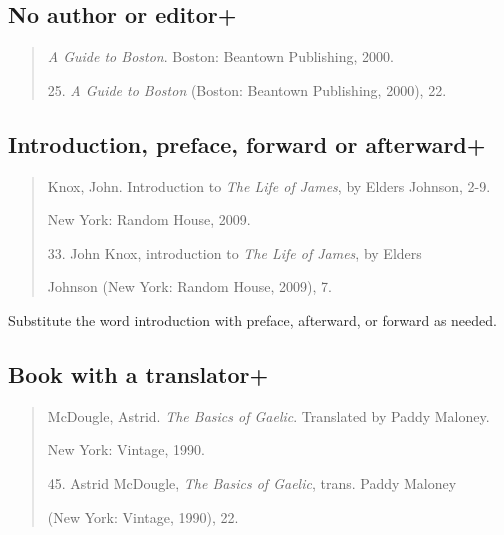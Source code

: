 \subsection{No author or editor+}

\begin{quote}

\emph{A Guide to Boston}. Boston: Beantown Publishing, 2000.

\medskip

\hspace{.4in}25. \emph{A Guide to Boston} (Boston: Beantown Publishing, 2000), 22.
\end{quote}

\subsection{Introduction, preface, forward or afterward+}
\begin{quote}

Knox, John. Introduction to \emph{The Life of James}, by Elders Johnson, 2-9.

\hspace{.4in}New York: Random House, 2009.

\medskip

\hspace{.4in}33. John Knox, introduction to \emph{The Life of James}, by Elders 

Johnson (New York: Random House, 2009), 7.
\end{quote}

 Substitute the word introduction with preface, afterward, or forward as needed.



\subsection{Book with a translator+} 
\begin{quote}
McDougle, Astrid. \emph{The Basics of Gaelic}. Translated by Paddy Maloney.

\hspace{.4in}New York: Vintage, 1990.

\medskip

\hspace{.4in}45. Astrid McDougle, \emph{The Basics of Gaelic}, trans. Paddy Maloney

(New York: Vintage, 1990), 22.
\end{quote}


